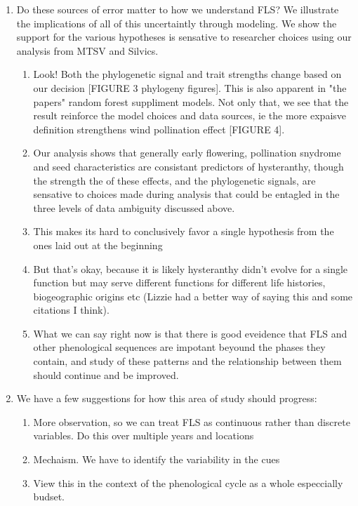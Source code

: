 \documentclass{article}
\begin{document}
\begin{enumerate}
\begin{enumerate}
\end{enumerate}
\item Do these sources of error matter to how we understand FLS? We illustrate the implications of all of this uncertaintly through modeling. We show the support for the various hypotheses is sensative to researcher choices using our analysis from MTSV and Silvics.
\begin{enumerate}
\item Look! Both the phylogenetic signal and trait strengths change based on our decision [FIGURE 3 phylogeny figures]. This is also apparent in "the papers" random forest suppliment models. Not only that, we see that the result reinforce the model choices and data sources, ie the more expaisve definition strengthens wind pollination effect [FIGURE 4].
\item Our analysis shows that generally early flowering, pollination snydrome and seed characteristics are consistant predictors of hysteranthy, though the strength the of these effects, and the phylogenetic signals, are sensative to choices made during analysis that could be entagled in the three levels of data ambiguity discussed above. 
\item This makes its hard to conclusively favor a single hypothesis from the ones laid out at the beginning
\item But that's okay, because it is likely hysteranthy didn't evolve for a single function but may serve different functions for different life histories, biogeographic origins etc (Lizzie had a better way of saying this and some citations I think).
\item What we can say right now is that there is good eveidence that FLS and other phenological sequences are impotant beyound the phases they contain, and study of these patterns and the relationship between them should continue and be improved.
\end{enumerate}
\item We have a few suggestions for how this area of study should progress:
\begin{enumerate}
\item More observation, so we can treat FLS as continuous rather than discrete variables. Do this over multiple years and locations
\item Mechaism. We have to identify the variability in the cues
\item View this in the context of the phenological cycle as a whole especcially  budset.
\end{enumerate}
\end{enumerate}
\end{document}
